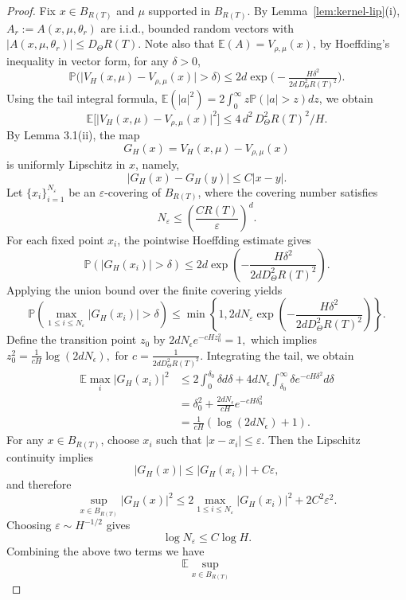 \documentclass[11pt,a4wide]{article}
\theoremstyle{definition}
\begin{document}
\begin{proof}
Fix $x\in B_{R(T)}$ and $\mu$ supported in $B_{R(T)}$. By Lemma~\ref{lem:kernel-lip}(i), $A_r:=A(x,\mu,\theta_r)$ are i.i.d., bounded random vectors with $|A(x,\mu,\theta_r)|\le D_\Theta R(T)$. Note also that $\mathbb{E}(A)=V_{\rho,\mu}(x)$, by Hoeffding's inequality in vector form, for any $\delta>0$,
\[
\mathbb P\Big(\Big| V_H(x, \mu) - V_{\rho,\mu}(x)\Big| > \delta\Big) \le 2d\exp\Big(-\tfrac{H\delta^2}{2d\,D_\Theta^2R(T)^2}\Big).
\]
Using the tail integral formula, $\mathbb{E}(|a|^2)=2\int_0^\infty z \mathbb P(|a| > z) dz$, we obtain 
$$
\mathbb E\big[\big|V_H(x,\mu)-V_{\rho,\mu}(x)\big|^2\big]\le 4\,d^2\,D_\Theta^2R(T)^2/H.
$$
By Lemma 3.1(ii), the map
\[
G_H(x)
= V_H(x, \mu) -V_{\rho,\mu}(x)
\]
is uniformly Lipschitz in $x$, namely,
\[
|G_H(x)-G_H(y)|\leq C|x-y|.
\]
Let $\{x_i\}_{i=1}^{N_\varepsilon}$ be an $\varepsilon$-covering of 
$B_{R(T)}$, where the covering number satisfies
\[
N_\varepsilon\leq
\left(\frac{CR(T)}{\varepsilon}\right)^d .
\]
For each fixed point $x_i$, the pointwise Hoeffding estimate gives
\[
\mathbb{P}\left(|G_H(x_i)|>\delta\right)
\leq
2d\exp\left(-\frac{H\delta^2}{2dD_\Theta^2R(T)^2}\right).
\]
Applying the union bound over the finite covering yields
\[
\mathbb{P}\left(
\max_{1\leq i\leq N_\varepsilon}|G_H(x_i)|>\delta
\right)
\leq
\min \left\{1, 2dN_\varepsilon
\exp\left(-\frac{H\delta^2}
{2dD_\Theta^2R(T)^2}\right) \right\}.
\]
Define the transition point $z_0$ by
$2dN_\epsilon e^{-cHz_0^2}=1,$  which implies $z_0^2= \frac{1}{cH}\log(2dN_\epsilon),$ 
for $c= \frac{1}{2dD_\Theta^2R(T)^2}$. Integrating the tail, we obtain 
\begin{align*}
\mathbb{E} \max_i |G_H(x_i)|^2 & \leq 2\int_0^{\delta_0} \delta d\delta +  4dN_\epsilon \int_{\delta_0}^\infty \delta e^{-cH\delta^2}d\delta \\
& = \delta_0^2 +\frac{2dN_\epsilon}{cH}e^{-cH\delta_0^2}\\
& =  \frac{1}{cH}(\log(2dN_\epsilon) +1). 
\end{align*}  
For any $x\in B_{R(T)}$, choose $x_i$ such that
$|x-x_i|\leq\varepsilon$. Then the Lipschitz continuity implies
\[
|G_H(x)|
\leq
|G_H(x_i)|+C\varepsilon,
\]
and therefore
\[
\sup_{x\in B_{R(T)}}|G_H(x)|^2
\leq
2 \max_{1\leq i\leq N_\varepsilon}|G_H(x_i)|^2
+2C^2\varepsilon^2.
\]
Choosing $\varepsilon\sim H^{-1/2}$ gives
\[
\log N_\varepsilon
\leq
C\log H .
\]
Combining the above two terms we have 
\[
\mathbb{E}
\sup_{x\in B_{R(T)}}
\]
\end{proof}
\end{document}
